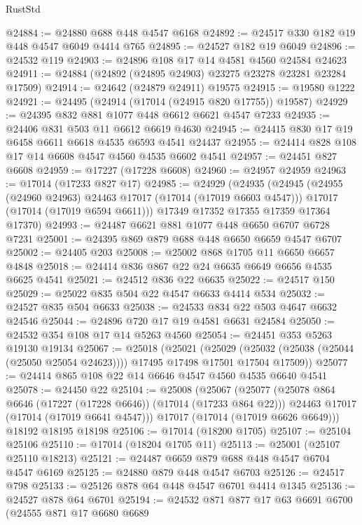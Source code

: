 \begin{lexlean}{RustStd}
\begin{coremodule}
{\begin{coremodule}
{{{{{{{{{{{{{{{{{{{{{{{{{{{{{{{{{{{{{{{{{{{{{{{{{{{{{{{@24884 := @24880 @688 @448 @4547 @6168
@24892 := @24517 @330 @182 @19 @448 @4547 @6049 @4414 @765
@24895 := @24527 @182 @19 @6049
@24896 := @24532 @119
@24903 := @24896 @108 @17 @14 @4581 @4560 @24584 @24623
@24911 := @24884 (@24892 (@24895 @24903) @23275 @23278 @23281 @23284 @17509)
@24914 := @24642 (@24879 @24911) @19575
@24915 := @19580 @1222
@24921 := @24495 (@24914 (@17014 (@24915 @820 @17755)) @19587)
@24929 := @24395 @832 @881 @1077 @448 @6612 @6621 @4547 @7233
@24935 := @24406 @831 @503 @11 @6612 @6619 @4630
@24945 := @24415 @830 @17 @19 @6458 @6611 @6618 @4535 @6593 @4541 @24437
@24955 := @24414 @828 @108 @17 @14 @6608 @4547 @4560 @4535 @6602 @4541
@24957 := @24451 @827 @6608
@24959 := @17227 (@17228 @6608)
@24960 := @24957 @24959
@24963 := @17014 (@17233 @827 @17)
@24985 := @24929
    (@24935
      (@24945
        (@24955 (@24960 @24963) @24463 @17017 (@17014 (@17019 @6603 @4547)))
        @17017
        (@17014 (@17019 @6594 @6611)))
      @17349
      @17352
      @17355
      @17359
      @17364
      @17370)
@24993 := @24487 @6621 @881 @1077 @448 @6650 @6707 @6728 @7231
@25001 := @24395 @869 @879 @688 @448 @6650 @6659 @4547 @6707
@25002 := @24405 @203
@25008 := @25002 @868 @1705 @11 @6650 @6657 @4848
@25018 := @24414 @836 @867 @22 @24 @6635 @6649 @6656 @4535 @6625 @4541
@25021 := @24512 @836 @22 @6635
@25022 := @24517 @150
@25029 := @25022 @835 @504 @22 @4547 @6633 @4414 @534
@25032 := @24527 @835 @504 @6633
@25038 := @24533 @834 @22 @503 @4647 @6632 @24546
@25044 := @24896 @720 @17 @19 @4581 @6631 @24584
@25050 := @24532 @354 @108 @17 @14 @5263 @4560
@25054 := @24451 @353 @5263 @19130 @19134
@25067 := @25018
    (@25021
      (@25029 (@25032 (@25038 (@25044 (@25050 @25054 @24623)))) @17495 @17498 @17501 @17504 @17509))
@25077 := @24414 @865 @108 @22 @14 @6646 @4547 @4560 @4535 @6640 @4541
@25078 := @24450 @22
@25104 := @25008
    (@25067
      (@25077
        (@25078 @864 @6646 (@17227 (@17228 @6646)) (@17014 (@17233 @864 @22)))
        @24463
        @17017
        (@17014 (@17019 @6641 @4547)))
      @17017
      (@17014 (@17019 @6626 @6649)))
    @18192
    @18195
    @18198
@25106 := @17014 (@18200 @1705)
@25107 := @25104 @25106
@25110 := @17014 (@18204 @1705 @11)
@25113 := @25001 (@25107 @25110 @18213)
@25121 := @24487 @6659 @879 @688 @448 @4547 @6704 @4547 @6169
@25125 := @24880 @879 @448 @4547 @6703
@25126 := @24517 @798
@25133 := @25126 @878 @64 @448 @4547 @6701 @4414 @1345
@25136 := @24527 @878 @64 @6701
@25194 := @24532
    @871
    @877
    @17
    @63
    @6691
    @6700
    (@24555
      @871
      @17
      @6680
      @6689
}}}}}}}}}}}}}}}}}}}}}}}}}}}}}}}}}}}}}}}}}}}}}}}}}}}}}}}
\end{coremodule}}
\end{coremodule}
\end{lexlean}
